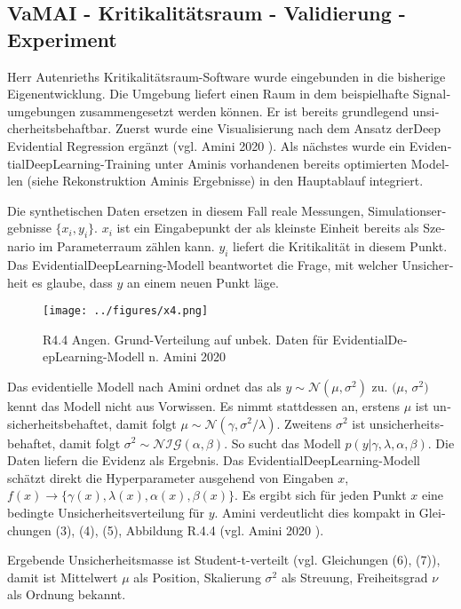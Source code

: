 \begin{otherlanguage}{ngerman}
\subsection*{VaMAI - Kritikalitätsraum - Validierung - Experiment}

Herr Autenrieths Kritikalitätsraum-Software wurde eingebunden in die bisherige Eigenentwicklung. Die Umgebung liefert einen Raum in dem beispielhafte Signalumgebungen 
zusammengesetzt werden können. Er ist bereits grundlegend unsicherheitsbehaftbar. Zuerst wurde eine Visualisierung nach dem Ansatz der\glqq{}Deep Evidential Regression\grqq{} ergänzt (vgl. Amini 2020 \parencite{amini2020}). Als nächstes wurde ein \gls{EvidentialDeepLearning}-Training unter Aminis vorhandenen bereits optimierten Modellen (siehe Rekonstruktion Aminis Ergebnisse) in den Hauptablauf integriert. 

Die synthetischen Daten ersetzen in diesem Fall reale Messungen, Simulationsergebnisse $\{ x_{i}, y_{i} \}$. $x_{i}$ ist ein Eingabepunkt der als kleinste Einheit bereits als Szenario im Parameterraum zählen kann. $y_{i}$ liefert die Kritikalität in diesem Punkt. Das \gls{EvidentialDeepLearning}-Modell beantwortet die Frage, mit welcher Unsicherheit es glaube, dass $y$ an einem neuen Punkt läge. 

\begin{figure}[!ht]
  \centering
  \texttt{[image: ../figures/x4.png]}
  \caption{R4.4 Angen. Grund-Verteilung auf unbek. Daten für \gls{EvidentialDeepLearning}-Modell n. Amini 2020}
\end{figure}

Das evidentielle Modell nach Amini ordnet das als $y \sim \mathcal{N}(\mu, \sigma^2)$ zu. $(\mu$, $\sigma^2)$ kennt das Modell nicht aus Vorwissen. Es nimmt stattdessen an, erstens $\mu$ ist unsicherheitsbehaftet, damit folgt $\mu \sim \mathcal{N}(\gamma, \sigma^{2} / \lambda)$. Zweitens $\sigma^{2}$ ist unsicherheitsbehaftet, damit folgt $\sigma^{2} \sim \mathcal{NIG}(\alpha, \beta)$. So sucht das Modell $p(y|\gamma,\lambda,\alpha,\beta)$. Die Daten liefern die Evidenz als Ergebnis. Das \gls{EvidentialDeepLearning}-Modell schätzt direkt die Hyperparameter ausgehend von Eingaben $x$, $f(x) \rightarrow \{ \gamma(x), \lambda(x), \alpha(x), \beta(x) \}$. Es ergibt sich für jeden Punkt $x$ eine bedingte Unsicherheitsverteilung für $y$. Amini verdeutlicht dies kompakt in Gleichungen (3), (4), (5), Abbildung R.4.4 (vgl. Amini 2020 \parencite{amini2020}). 

Ergebende Unsicherheitsmasse ist Student-t-verteilt (vgl. Gleichungen (6), (7)), damit ist Mittelwert $\mu$ als \glqq{}Position\grqq{}, Skalierung $\sigma^{2}$ als \glqq{}Streuung\grqq{}, Freiheitsgrad $\nu$ als \glqq{}Ordnung\grqq{} bekannt. 


\end{otherlanguage}
